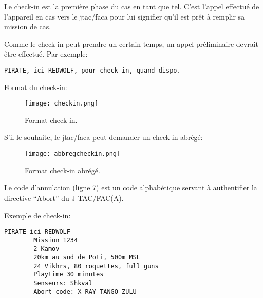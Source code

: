 \begin{e1}
	\begin{minipage}{\linewidth}
		\item
		Le check-in est la première phase du \acrshort{cas} en tant que tel. C’est l’appel effectué de l’appareil en \acrshort{cas} vers le \acrshort{jtac}/\acrshort{faca} pour lui signifier qu’il est prêt à remplir sa mission de \acrshort{cas}.
		\item Comme le check-in peut prendre un certain temps, un appel préliminaire devrait être effectué. Par exemple:
		\begin{lstlisting}[caption=Appel préliminaire, label=preliminary_call]
		PIRATE, ici REDWOLF, pour check-in, quand dispo.
		\end{lstlisting}
	\end{minipage}
	
	\begin{minipage}{\linewidth}
		\item Format du check-in:
		\begin{figure}[H]
			\texttt{[image: checkin.png]}
			\caption{Format check-in.}
			\label{fig:checkin}
		\end{figure}	
	\end{minipage}
	
	\begin{minipage}{\linewidth}
		\item S'il le souhaite, le \gls{jtac}/\gls{faca} peut demander un check-in abrégé:
		\begin{figure}[H]
			\texttt{[image: abbregcheckin.png]}
			\caption{Format check-in abrégé.}
			\label{fig:abbregcheckin}
		\end{figure}
	\end{minipage}
	
	\item Le code d’annulation (ligne 7) est un code alphabétique servant à authentifier la directive ``Abort'' du J-TAC/FAC(A).
	
	\begin{minipage}{\linewidth}
		\item Exemple de check-in:
		\begin{lstlisting}[caption=Check-in, label=checkin]
		PIRATE ici REDWOLF
		Mission 1234
		2 Kamov
		20km au sud de Poti, 500m MSL
		24 Vikhrs, 80 roquettes, full guns
		Playtime 30 minutes
		Senseurs: Shkval
		Abort code: X-RAY TANGO ZULU
		\end{lstlisting}
	\end{minipage}
\end{e1}
